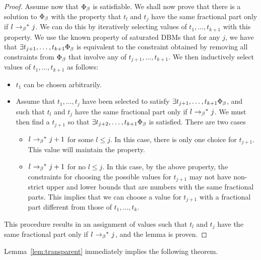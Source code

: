 \begin{proof}
Assume now that $\Phi_{\beta}$ is satisfiable.
We shall now prove that
there is a solution to  $\Phi_{\beta}$ with the property that
$t_l$ and $t_j$ have the same fractional part only if
$l \ {\rightarrow_{\beta}}^*\  j$. We can do this by iteratively selecting
values of $t_1, \ldots , t_{k+1}$ with this property. We use the known
property of saturated DBMs that for any $j$, we have that
$\exists t_{j+1}, \ldots , t_{k+1}\Phi_{\beta}$ is equivalent to the
constraint obtained by removing all constraints from $\Phi_{\beta}$ that
involve any of $t_{j+1}, \ldots , t_{k+1}$.
We then inductively select values of $t_1, \ldots , t_{k+1}$ as follows:
\begin{itemize}
\item
  $t_1$ can be chosen arbitrarily.
\item Assume that  $t_1, \ldots , t_j$ have been selected to satisfy
  $\exists t_{j+1}, \ldots , t_{k+1}\Phi_{\beta}$, and such that
  $t_l$ and $t_j$ have the same fractional part only if
  $l \ {\rightarrow_{\beta}}^*\  j$.
  We must then find a $t_{j+1}$ so that
  $\exists t_{j+2}, \ldots , t_{k+1}\Phi_{\beta}$ is satisfied.
  There are two cases
  \begin{itemize}
  \item
    $l \ {\rightarrow_{\beta}}^*\  j+1$ for some $l \leq j$. In this case, there is only
    one choice for $t_{j+1}$. This value will maintain the property.
  \item
    $l \ {\rightarrow_{\beta}}^*\  j+1$ for no $l \leq j$. In this case, by the
    above property, the constraints for choosing the possible values for
    $t_{j+1}$ may not have non-strict upper and lower bounds that are numbers
    with the same fractional parts. This implies that we can choose a value
    for $t_{j+1}$ with a fractional part different from those of
     $t_1, \ldots , t_k$.
  \end{itemize}
\end{itemize}
This procedure results in an assignment of values such that
  $t_l$ and $t_j$ have the same fractional part only if
  $l \ {\rightarrow_{\beta}}^*\  j$, and the lemma is proven.
\end{proof}

Lemma~\ref{lem:transparent}  immediately implies the following
theorem.


